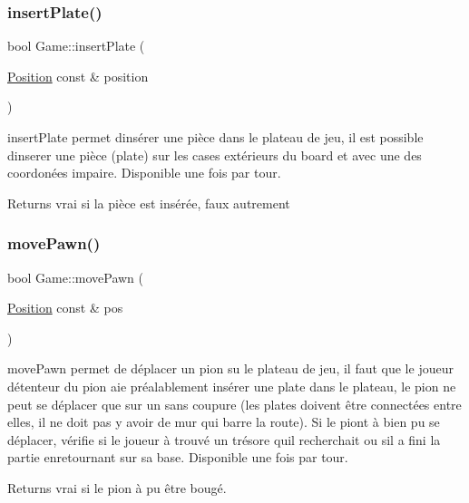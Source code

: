 \subsubsection{\texorpdfstring{insertPlate()}{insertPlate()}}
{\footnotesize\ttfamily bool Game\+::insert\+Plate (\begin{DoxyParamCaption}\item[{\mbox{\hyperlink{class_position}{Position}} const \&}]{position }\end{DoxyParamCaption})}



insert\+Plate permet d\textquotesingle{}insérer une pièce dans le plateau de jeu, il est possible d\textquotesingle{}inserer une pièce (plate) sur les cases extérieurs du board et avec une des coordonées impaire. Disponible une fois par tour. 

\begin{DoxyReturn}{Returns}
vrai si la pièce est insérée, faux autrement 
\end{DoxyReturn}
\mbox{\label{class_game_a972bf039217d747db1fd3487574a58a8}} 
\subsubsection{\texorpdfstring{movePawn()}{movePawn()}}
{\footnotesize\ttfamily bool Game\+::move\+Pawn (\begin{DoxyParamCaption}\item[{\mbox{\hyperlink{class_position}{Position}} const \&}]{pos }\end{DoxyParamCaption})}



move\+Pawn permet de déplacer un pion su le plateau de jeu, il faut que le joueur détenteur du pion aie préalablement insérer une plate dans le plateau, le pion ne peut se déplacer que sur un sans coupure (les plates doivent être connectées entre elles, il ne doit pas y avoir de mur qui barre la route). Si le piont à bien pu se déplacer, vérifie si le joueur à trouvé un trésore qu\textquotesingle{}il recherchait ou s\textquotesingle{}il a fini la partie enretournant sur sa base. Disponible une fois par tour. 

\begin{DoxyReturn}{Returns}
vrai si le pion à pu être bougé. 
\end{DoxyReturn}
\mbox{\label{class_game_a6ba6dd6ff7977278e7884642d167549d}} 
